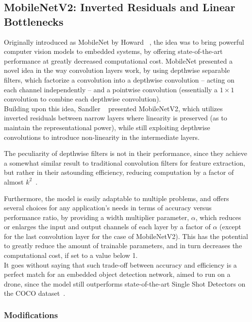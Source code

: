\subsection{MobileNetV2: Inverted Residuals and Linear Bottlenecks}

Originally introduced as MobileNet by Howard \etal~\cite{MobileNet}, the idea
was to bring powerful computer vision models to embedded systems, by offering
state-of-the-art performance at greatly decreased computational cost. MobileNet
presented a novel idea in the way convolution layers work, by using depthwise
separable filters, which factorize a convolution into a depthwise convolution
-- acting on each channel independently -- and a pointwise convolution
(essentially a $1\times1$ convolution to combine each depthwise convolution).\\

Building upon this idea, Sandler \etal~\cite{MobileNetV2} presented
MobileNetV2, which utilizes inverted residuals between narrow layers where
linearity is preserved (as to maintain the representational power), while still
exploiting depthwise convolutions to introduce non-linearity in the
intermediate layers.

The peculiarity of depthwise filters is not in their performance, since they
achieve a somewhat similar result to traditional convolution filters for
feature extraction, but rather in their astounding efficiency, reducing
computation by a factor of almost $k^2$~\cite{MobileNetV2}.

Furthermore, the model is easily adaptable to multiple problems, and offers
several choices for any application's needs in terms of accuracy versus
performance ratio, by providing a width multiplier parameter, $\alpha$, which
reduces or enlarges the input and output channels of each layer by a factor of
$\alpha$ (except for the last convolution layer for the case of MobileNetV2).
This has the potential to greatly reduce the amount of trainable parameters,
and in turn decreases the computational cost, if set to a value below 1.\\

It goes without saying that such trade-off between accuracy and efficiency is a
perfect match for an embedded object detection network, aimed to run on a
drone, since the model still outperforms state-of-the-art Single Shot Detectors
on the COCO dataset~\cite{MobileNetV2}.

\subsubsection{Modifications}

